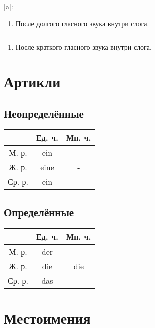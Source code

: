 \documentclass[oneside]{book}
\begin{document}
	[a]:
	\begin{enumerate}
		\item После долгого гласного звука внутри слога.
	\end{enumerate}

	\begin{math}
		[\mu]
	\end{math}
	\begin{enumerate}
		\item После краткого гласного звука внутри слога.
	\end{enumerate}

	\chapter{Артикли}
	\section{Неопределённые}
	\begin{center}
		\begin{tabular}{|c|c|c|}
			\hline
			       & Ед. ч. & Мн. ч.                \\ \hline
			М. р.  & ein    & \multirow{3}{*}{-}    \\ \cline{1-2}
			Ж. р.  & eine   &                       \\ \cline{1-2}
			Ср. р. & ein    &                       \\ \hline
		\end{tabular}
	\end{center}

	\section{Определённые}
	\begin{center}
		\begin{tabular}{|c|c|c|}
			\hline
			       & Ед. ч. & Мн. ч.                \\ \hline
			М. р.  & der    & \multirow{3}{*}{die}  \\ \cline{1-2}
			Ж. р.  & die    &                       \\ \cline{1-2}
			Ср. р. & das    &                       \\ \hline
		\end{tabular}
	\end{center}

	\chapter{Местоимения}
\end{document}
